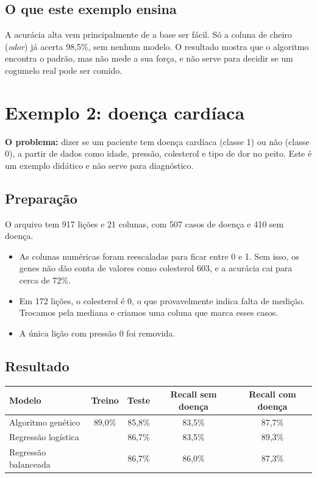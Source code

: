 \documentclass[11pt,a4paper]{article}
\newcommand{\code}[1]{\texttt{\detokenize{#1}}}
\newenvironment{tabela}{\par\nopagebreak[4]\vspace{0.3em}\nopagebreak[4]\begingroup\centering\small}{\par\endgroup\vspace{0.6em}}
\begin{document}
\subsection{O que este exemplo ensina}

A acurácia alta vem principalmente de a base ser fácil. Só a coluna de cheiro (\emph{odor}) já acerta 98,5\%, sem nenhum modelo. O resultado mostra que o algoritmo encontra o padrão, mas não mede a sua força, e não serve para decidir se um cogumelo real pode ser comido.

\clearpage
\section{Exemplo 2: doença cardíaca}

\textbf{O problema:} dizer se um paciente tem doença cardíaca (classe 1) ou não (classe 0), a partir de dados como idade, pressão, colesterol e tipo de dor no peito. Este é um exemplo didático e não serve para diagnóstico.

\subsection{Preparação}

O arquivo \code{dados_coracao.xlsx} tem 917 lições e 21 colunas, com 507 casos de doença e 410 sem doença.

\begin{itemize}
  \item As colunas numéricas foram reescaladas para ficar entre 0 e 1. Sem isso, os genes não dão conta de valores como colesterol 603, e a acurácia cai para cerca de 72\%.
  \item Em 172 lições, o colesterol é 0, o que provavelmente indica falta de medição. Trocamos pela mediana e criamos uma coluna que marca esses casos.
  \item A única lição com pressão 0 foi removida.
\end{itemize}

\subsection{Resultado}

\begin{tabela}
\begin{tabular}{lcccc}
\toprule
Modelo & Treino & Teste & Recall sem doença & Recall com doença\\
\midrule
Algoritmo genético & 89,0\% & 85,8\% & 83,5\% & 87,7\%\\
Regressão logística & & 86,7\% & 83,5\% & 89,3\%\\
Regressão balanceada & & 86,7\% & 86,0\% & 87,3\%\\
\bottomrule
\end{tabular}
\end{tabela}
\end{document}
